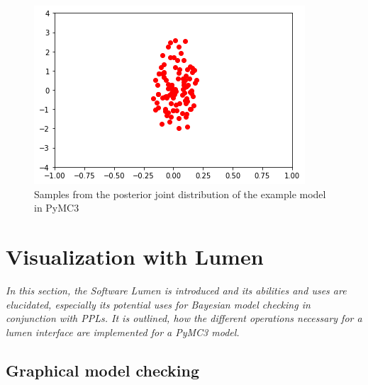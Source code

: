 \documentclass{article}
\begin{document}
\begin{figure}
	\includegraphics[width=\textwidth]{images/PyMC3_joint_posterior_samples_simple_model.png}
	\caption[Samples from the posterior joint distribution of the example model in PyMC3]{Samples from the posterior joint distribution of the example model in PyMC3}
	\label{fig:PyMC3_joint_posterior_samples_simple_model}
\end{figure}

\section{Visualization with Lumen}
\textit{In this section, the Software Lumen is introduced and its abilities and uses are elucidated, especially its potential uses for Bayesian model checking in conjunction with PPLs. It is outlined, how the different operations necessary for a lumen interface are implemented for a PyMC3 model.} 



\subsection{Graphical model checking}
\end{document}
